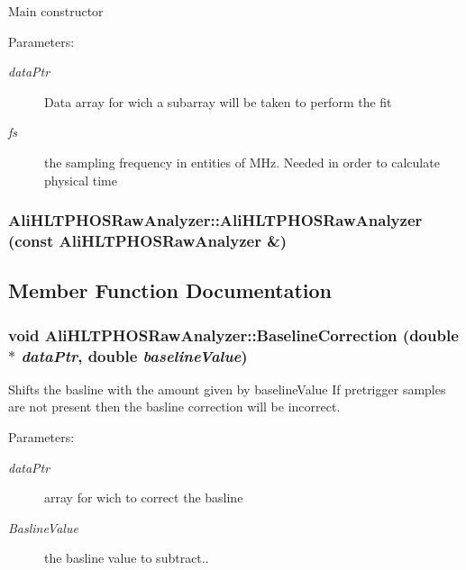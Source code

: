 Main constructor \begin{Desc}
\item[Parameters:]
\begin{description}
\item[{\em data\-Ptr}]Data array for wich a subarray will be taken to perform the fit \item[{\em fs}]the sampling frequency in entities of MHz. Needed in order to calculate physical time \end{description}
\end{Desc}
\subsubsection{\setlength{\rightskip}{0pt plus 5cm}Ali\-HLTPHOSRaw\-Analyzer::Ali\-HLTPHOSRaw\-Analyzer (const {\bf Ali\-HLTPHOSRaw\-Analyzer} \&)}\label{classAliHLTPHOSRawAnalyzer_a3}




\subsection{Member Function Documentation}
\subsubsection{\setlength{\rightskip}{0pt plus 5cm}void Ali\-HLTPHOSRaw\-Analyzer::Baseline\-Correction (double $\ast$ {\em data\-Ptr}, double {\em baseline\-Value})}\label{classAliHLTPHOSRawAnalyzer_a6}


Shifts the basline with the amount given by baseline\-Value If pretrigger samples are not present then the basline correction will be incorrect. \begin{Desc}
\item[Parameters:]
\begin{description}
\item[{\em data\-Ptr}]array for wich to correct the basline \item[{\em Basline\-Value}]the basline value to subtract.. \end{description}
\end{Desc}
